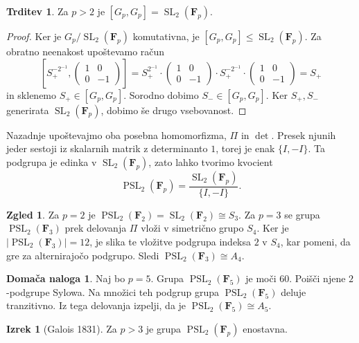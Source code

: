 \documentclass[11pt]{book}
\def\FF{\mathbf{F}}
\DeclareMathOperator\SL{SL}
\DeclareMathOperator\PSL{PSL}
\theoremstyle{definition}
\theoremstyle{zgled}
\newtheorem*{zgled}{Zgled}
\theoremstyle{odprtproblem}
\theoremstyle{domacanaloga}
\newtheorem*{domacanaloga}{Domača naloga}
\newenvironment{dokaz}
    {\color{siva}\begin{proof}}
    {\end{proof}}
\theoremstyle{izrek}
\newtheorem*{izrek}{Izrek}
\newtheorem*{trditev}{Trditev}
\begin{document}
\begin{trditev}
Za $p > 2$ je $[G_p, G_p] = \SL_2(\FF_p)$.
\end{trditev}
\begin{dokaz}
Ker je $G_p/\SL_2(\FF_p)$ komutativna, je $[G_p,G_p] \leq \SL_2(\FF_p)$. Za obratno neenakost upoštevamo račun
\[
    \left[ 
        S_+^{-2^{-1}}, 
        \begin{pmatrix}
            1 & 0 \\ 0 & -1 
        \end{pmatrix}
    \right] =
    S_+^{2^{-1}} \cdot 
    \begin{pmatrix}
        1 & 0 \\ 0 & -1 
    \end{pmatrix}
    \cdot S_+^{-2^{-1}} \cdot
    \begin{pmatrix}
        1 & 0 \\ 0 & -1 
    \end{pmatrix}
    = S_+
\]
in sklenemo $S_+ \in [G_p, G_p]$. Sorodno dobimo $S_- \in [G_p, G_p]$. Ker $S_+,S_-$ generirata $\SL_2(\FF_p)$, dobimo še drugo vsebovanost.
\end{dokaz} 

Nazadnje upoštevajmo oba posebna homomorfizma, $\Pi$ in $\det$. Presek njunih jeder sestoji iz skalarnih matrik z determinanto $1$, torej je enak $\{ I, -I \}$. Ta podgrupa je edinka v $\SL_2(\FF_p)$, zato lahko tvorimo kvocient
\[
    {\textstyle \PSL_2(\FF_p)} = \frac{\SL_2(\FF_p)}{\{ I, -I \}}.
\]

\begin{zgled}
Za $p = 2$ je $\PSL_2(\FF_2) = \SL_2(\FF_2) \cong S_3$. Za $p = 3$ se grupa $\PSL_2(\FF_3)$ prek delovanja $\Pi$ vloži v simetrično grupo $S_4$. Ker je $|\PSL_2(\FF_3)| = 12$, je slika te vložitve podgrupa indeksa $2$ v $S_4$, kar pomeni, da gre za alternirajočo podgrupo. Sledi $\PSL_2(\FF_3) \cong A_4$.
\end{zgled}

\begin{domacanaloga}
Naj bo $p = 5$. Grupa $\PSL_2(\FF_5)$ je moči $60$. Poišči njene $2$-podgrupe Sylowa. Na množici teh podgrup grupa $\PSL_2(\FF_5)$ deluje tranzitivno. Iz tega delovanja izpelji, da je $\PSL_2(\FF_5) \cong A_5$. 
\end{domacanaloga}

\begin{izrek}[Galois 1831]
Za $p > 3$ je grupa $\PSL_2(\FF_p)$ enostavna.
\end{izrek}
\end{document}
